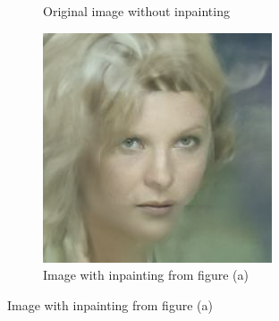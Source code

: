\begin{figure}[H]
\begin{subfigure}[b]{0.25\textwidth}
        \caption{Original image without inpainting}
    \end{subfigure}
    \begin{subfigure}[b]{0.25\textwidth}
        \includegraphics[width=\textwidth]{./figures/inpaint_steps1000_seed42_img_0}
        \caption{Image with inpainting from figure (a)}
    \end{subfigure}
\end{figure}